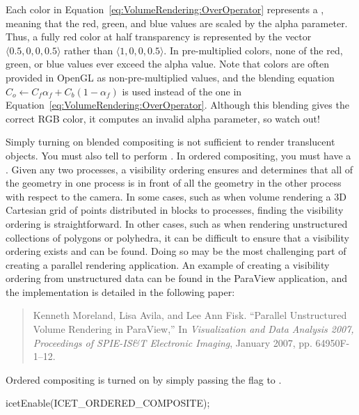 Each color in Equation~\ref{eq:VolumeRendering:OverOperator} represents a
, meaning that
the red, green, and blue values are scaled by the alpha parameter.  Thus, a
fully red color at half transparency is represented by the vector $\langle
0.5, 0, 0, 0.5 \rangle$ rather than $\langle 1, 0, 0, 0.5 \rangle$.  In
pre-multiplied colors, none of the red, green, or blue values ever exceed
the alpha value.  Note that colors are often provided in OpenGL as
non-pre-multiplied values, and the blending equation $C_o \leftarrow C_f
\alpha_f + C_b (1 - \alpha_f)$ is used instead of the one in
Equation~\ref{eq:VolumeRendering:OverOperator}.  Although this blending
gives the correct RGB color, it computes an invalid alpha parameter, so
watch out!


Simply turning on blended compositing is not sufficient to render
translucent objects.  You must also tell \IceT to perform .  In ordered compositing, you must have a
.  Given any two
processes, a visibility ordering ensures and determines that all of the
geometry in one process is in front of all the geometry in the other
process with respect to the camera.  In some cases, such as when volume
rendering a 3D Cartesian grid of points distributed in blocks to processes,
finding the visibility ordering is straightforward.  In other cases, such
as when rendering unstructured collections of polygons or polyhedra, it can
be difficult to ensure that a visibility ordering exists and can be found.
Doing so may be the most challenging part of creating a parallel rendering
application.  An example of creating a visibility ordering from unstructured
data can be found in the ParaView application, and the implementation is
detailed in the following paper:

\begin{quote}
  Kenneth Moreland, Lisa Avila, and Lee Ann Fisk. ``Parallel Unstructured
  Volume Rendering in ParaView,'' In \emph{Visualization and Data Analysis
    2007, Proceedings of SPIE-IS\&T Electronic Imaging}, January 2007,
  pp. 64950F-1--12.
\end{quote}

Ordered compositing is turned on by simply passing the
 flag to .
\begin{code}
  icetEnable(ICET_ORDERED_COMPOSITE);
\end{code}

